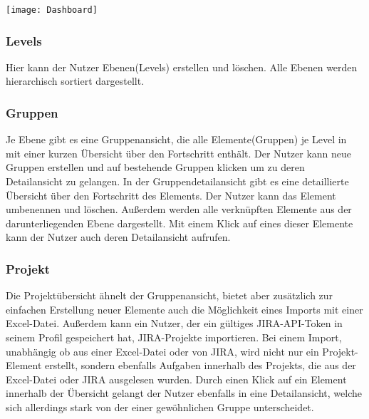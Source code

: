 \vspace{20pt}
\begin{center}
    \begin{minipage}{\linewidth}
        \texttt{[image: Dashboard]}
    \end{minipage}
\end{center}
\vspace{20pt}

\subsubsection{Levels}
Hier kann der Nutzer Ebenen(Levels) erstellen und löschen. Alle Ebenen werden hierarchisch sortiert dargestellt.

\subsubsection{Gruppen}
Je Ebene gibt es eine Gruppenansicht, die alle Elemente(Gruppen) je Level in mit einer kurzen Übersicht über den Fortschritt enthält. Der Nutzer kann neue Gruppen erstellen und auf bestehende Gruppen klicken um zu deren Detailansicht zu gelangen.
In der Gruppendetailansicht gibt es eine detaillierte Übersicht über den Fortschritt des Elements. Der Nutzer kann das Element umbenennen und löschen. Außerdem werden alle verknüpften Elemente aus der darunterliegenden Ebene dargestellt. Mit einem Klick auf eines dieser Elemente kann der Nutzer auch deren Detailansicht aufrufen.

\subsubsection{Projekt}
Die Projektübersicht ähnelt der Gruppenansicht, bietet aber zusätzlich zur einfachen Erstellung neuer Elemente auch die Möglichkeit eines Imports mit einer Excel-Datei. Außerdem kann ein Nutzer, der ein gültiges JIRA-API-Token in seinem Profil gespeichert hat, JIRA-Projekte importieren. Bei einem Import, unabhängig ob aus einer Excel-Datei oder von JIRA, wird nicht nur ein Projekt-Element erstellt, sondern ebenfalls Aufgaben innerhalb des Projekts, die aus der Excel-Datei oder JIRA ausgelesen wurden.
Durch einen Klick auf ein Element innerhalb der Übersicht gelangt der Nutzer ebenfalls in eine Detailansicht, welche sich allerdings stark von der einer gewöhnlichen Gruppe unterscheidet.

